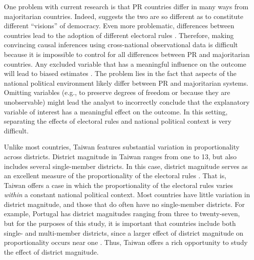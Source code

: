\documentclass[12pt]{article}
\begin{document}
One problem with current research is that PR countries differ in many ways from majoritarian countries. Indeed, \cite{Powell2000} suggests the two are so different as to constitute different ``visions'' of democracy. Even more problematic, differences between countries lead to the adoption of different electoral rules \citep{BlaisDobrzynskaIndridason, Boix1999}. Therefore, making convincing causal inferences using cross-national observational data is difficult because it is impossible to control for all differences between PR and majoritarian countries. Any excluded variable that has a meaningful influence on the outcome will lead to biased estimates \citep{Greene2008}. The problem lies in the fact that aspects of the national political environment likely differ between PR and majoritarian systems. Omitting variables (e.g., to preserve degrees of freedom or because they are unobservable) might lead the analyst to incorrectly conclude that the explanatory variable of interest has a meaningful effect on the outcome. In this setting, separating the effects of electoral rules and national political context is very difficult.

Unlike most countries, Taiwan features substantial variation in proportionality across districts. District magnitude in Taiwan ranges from one to 13, but also includes several single-member districts. In this case, district magnitude serves as an excellent measure of the proportionality of the electoral rules \citep{Cox1990, Benoit2000}. That is, Taiwan offers a case in which the proportionality of the electoral rules varies \textit{within} a constant national political context. Most countries have little variation in district magnitude, and those that do often have no single-member districts. For example, Portugal has district magnitudes ranging from three to twenty-seven, but for the purposes of this study, it is important that countries include both single- and multi-member districts, since a larger effect of district magnitude on proportionality occurs near one \citep{GrofmanSelb2011}. Thus, Taiwan offers a rich opportunity to study the effect of district magnitude. 
\end{document}
